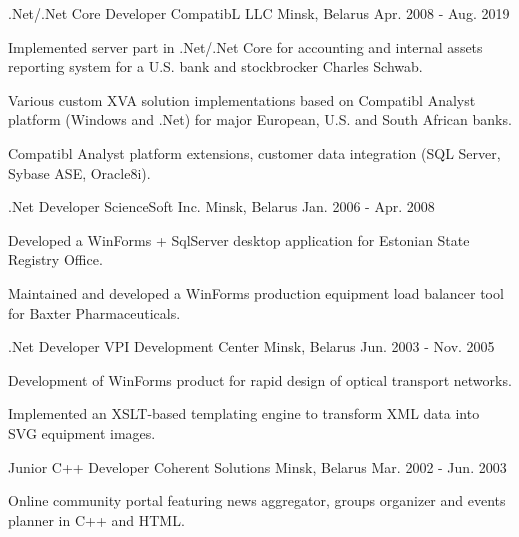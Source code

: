 \begin{cventries}
  \cventry
    {.Net/.Net Core Developer} %
    {CompatibL LLC} %
    {Minsk, Belarus} %
    {Apr. 2008 - Aug. 2019} %
    {
      \begin{cvitems} %
        \item {Implemented server part in .Net/.Net Core for accounting and internal assets reporting system for a U.S. bank and stockbrocker Charles Schwab.}
        \item {Various custom XVA solution implementations based on Compatibl Analyst platform (Windows and .Net) for major European, U.S. and South African banks.}
        \item {Compatibl Analyst platform extensions, customer data integration (SQL Server, Sybase ASE, Oracle8i).}  
      \end{cvitems}
    }

  \cventry
    {.Net Developer} %
    {ScienceSoft Inc.} %
    {Minsk, Belarus} %
    {Jan. 2006 - Apr. 2008} %
    {
      \begin{cvitems} %
        \item {Developed a WinForms + SqlServer desktop application for Estonian State Registry Office.}
        \item {Maintained and developed a WinForms production equipment load balancer tool for Baxter Pharmaceuticals.}
      \end{cvitems}
    }

  \cventry
    {.Net Developer} %
    {VPI Development Center} %
    {Minsk, Belarus} %
    {Jun. 2003 - Nov. 2005} %
    {
      \begin{cvitems} %
        \item {Development of WinForms product for rapid design of optical transport networks.}
        \item {Implemented an XSLT-based templating engine to transform XML data into SVG equipment images.}
      \end{cvitems}
    }

  \cventry
    {Junior C++ Developer} %
    {Coherent Solutions} %
    {Minsk, Belarus} %
    {Mar. 2002 - Jun. 2003} %
    {
      \begin{cvitems} %
        \item {Online community portal featuring news aggregator, groups organizer and events planner in C++ and HTML.}
      \end{cvitems}
    }

\end{cventries}
